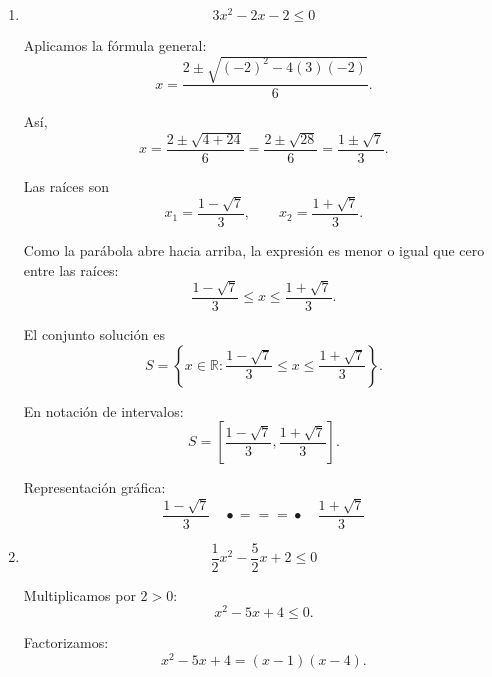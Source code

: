 \documentclass[12pt]{article}
\theoremstyle{plain}
\theoremstyle{definition}
\theoremstyle{remark}
\begin{document}
{\begin{enumerate}
Multiplicamos por \(-1\), invirtiendo el sentido de la desigualdad:
\[
x^2-3x-6\geq0.
\]

Aplicamos la fórmula general:
\[
x=
\frac{3\pm\sqrt{(-3)^2-4(1)(-6)}}{2}
=
\frac{3\pm\sqrt{9+24}}{2}.
\]

Por tanto,
\[
x=
\frac{3\pm\sqrt{33}}{2}.
\]

Las raíces son
\[
x_1=
\frac{3-\sqrt{33}}{2},
\qquad
x_2=
\frac{3+\sqrt{33}}{2}.
\]

Como
\[
x^2-3x-6\geq0,
\]

la solución corresponde a los intervalos exteriores:
\[
x\leq
\frac{3-\sqrt{33}}{2}
\qquad\text{o}\qquad
x\geq
\frac{3+\sqrt{33}}{2}.
\]

El conjunto solución es
\[
\boxed{
S=
\left\{
x\in\mathbb{R}:
x\leq
\frac{3-\sqrt{33}}{2}
\text{ o }
x\geq
\frac{3+\sqrt{33}}{2}
\right\}.
}
\]

En notación de intervalos:
\[
\boxed{
S=
\left(
-\infty,
\frac{3-\sqrt{33}}{2}
\right]
\cup
\left[
\frac{3+\sqrt{33}}{2},
\infty
\right).
}
\]

\item
\[
3x^2-2x-2\leq0
\]

Aplicamos la fórmula general:
\[
x=
\frac{2\pm\sqrt{(-2)^2-4(3)(-2)}}{6}.
\]

Así,
\[
x
=
\frac{2\pm\sqrt{4+24}}{6}
=
\frac{2\pm\sqrt{28}}{6}
=
\frac{1\pm\sqrt{7}}{3}.
\]

Las raíces son
\[
x_1=
\frac{1-\sqrt{7}}{3},
\qquad
x_2=
\frac{1+\sqrt{7}}{3}.
\]

Como la parábola abre hacia arriba, la expresión es menor o igual que
cero entre las raíces:
\[
\frac{1-\sqrt{7}}{3}
\leq x\leq
\frac{1+\sqrt{7}}{3}.
\]

El conjunto solución es
\[
\boxed{
S=
\left\{
x\in\mathbb{R}:
\frac{1-\sqrt{7}}{3}
\leq x\leq
\frac{1+\sqrt{7}}{3}
\right\}.
}
\]

En notación de intervalos:
\[
\boxed{
S=
\left[
\frac{1-\sqrt{7}}{3},
\frac{1+\sqrt{7}}{3}
\right].
}
\]

Representación gráfica:
\[
\frac{1-\sqrt{7}}{3}
\quad
\bullet\!\!=\!\!=\!\!=\!\bullet
\quad
\frac{1+\sqrt{7}}{3}
\]

\item
\[
\frac{1}{2}x^2-\frac{5}{2}x+2\leq0
\]

Multiplicamos por \(2>0\):
\[
x^2-5x+4\leq0.
\]

Factorizamos:
\[
x^2-5x+4=(x-1)(x-4).
\]


\end{enumerate}}
\end{document}
